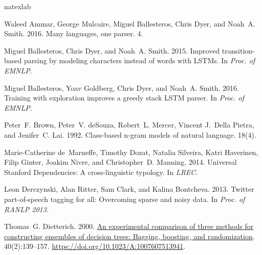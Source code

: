 \documentclass[11pt,a4paper]{article}
\begin{document}
\begin{thebibliography}{}
	\expandafter\ifx\csname natexlab\endcsname\relax\def\natexlab#1{#1}\fi
	
	Waleed Ammar, George Mulcaire, Miguel Ballesteros, Chris Dyer, and Noah~A.
	Smith. 2016.
	\newblock Many languages, one parser.
	 4.
	
	Miguel Ballesteros, Chris Dyer, and Noah~A. Smith. 2015.
	\newblock Improved transition-based parsing by modeling characters instead of
	words with {LSTMs}.
	\newblock In {\em Proc. of EMNLP\/}.
	
	Miguel Ballesteros, Yoav Goldberg, Chris Dyer, and Noah~A. Smith. 2016.
	\newblock Training with exploration improves a greedy stack {LSTM} parser.
	\newblock In {\em Proc. of EMNLP\/}.
	
	Peter~F. Brown, Peter~V. {deSouza}, Robert~L. Mercer, Vincent J.~Della Pietra,
	and Jenifer~C. Lai. 1992.
	\newblock Class-based n-gram models of natural language.
	 18(4).
	
	Marie-Catherine de~Marneffe, Timothy Dozat, Natalia Silveira, Katri Haverinen,
	Filip Ginter, Joakim Nivre, and Christopher~D. Manning. 2014.
	\newblock Universal {S}tanford {D}ependencies: A cross-linguistic typology.
	\newblock In {\em LREC\/}.
	
	Leon Derczynski, Alan Ritter, Sam Clark, and Kalina Bontcheva. 2013.
	\newblock Twitter part-of-speech tagging for all: Overcoming sparse and noisy
	data.
	\newblock In {\em Proc. of RANLP 2013\/}.
	
	Thomas~G. Dietterich. 2000.
	\newblock \href{https://doi.org/10.1023/A:1007607513941}{An experimental
		comparison of three methods for constructing ensembles of decision trees:
		Bagging, boosting, and randomization}.
	 40(2):139--157.
	\newblock
	\href{https://doi.org/10.1023/A:1007607513941}{https://doi.org/10.1023/A:1007607513941}.
	

\end{thebibliography}
\end{document}
